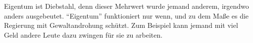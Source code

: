 Eigentum ist Diebstahl, denn dieser Mehrwert wurde jemand anderem, irgendwo anders ausgebeutet.
``Eigentum'' funktioniert nur wenn, und zu dem Maße es die Regierung mit Gewaltandrohung schützt.
Zum Beispiel kann jemand mit viel Geld andere Leute dazu zwingen für sie zu arbeiten.